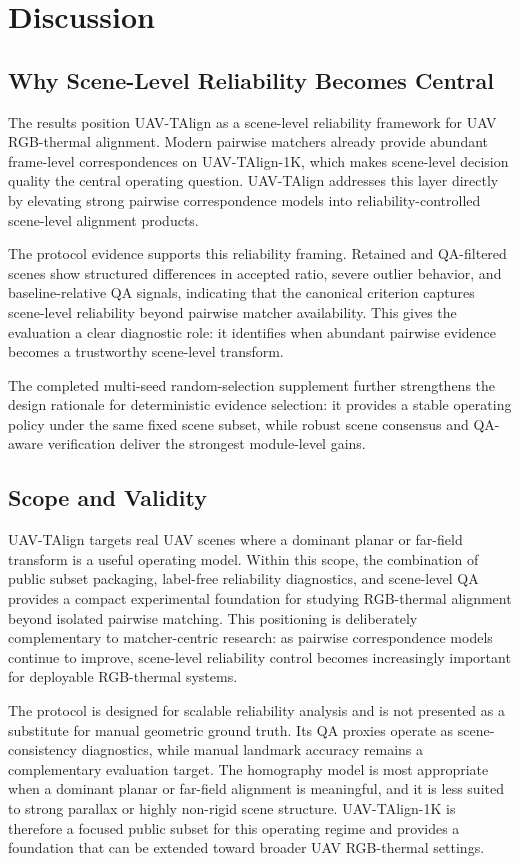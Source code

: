 
\section{Discussion}

\subsection{Why Scene-Level Reliability Becomes Central}

The results position UAV-TAlign as a scene-level reliability framework for UAV RGB-thermal
alignment. Modern pairwise matchers already provide abundant frame-level correspondences on
UAV-TAlign-1K, which makes scene-level decision quality the central operating question. UAV-TAlign
addresses this layer directly by elevating strong pairwise correspondence models into
reliability-controlled scene-level alignment products.

The protocol evidence supports this reliability framing. Retained and QA-filtered scenes show
structured differences in accepted ratio, severe outlier behavior, and baseline-relative QA
signals, indicating that the canonical criterion captures scene-level reliability beyond pairwise
matcher availability. This gives the evaluation a clear diagnostic role: it identifies when
abundant pairwise evidence becomes a trustworthy scene-level transform.

The completed multi-seed random-selection supplement further strengthens the design rationale for
deterministic evidence selection: it provides a stable operating policy under the same fixed
scene subset, while robust scene consensus and QA-aware verification deliver the strongest
module-level gains.

\subsection{Scope and Validity}

UAV-TAlign targets real UAV scenes where a dominant planar or far-field transform is a useful
operating model. Within this scope, the combination of public subset packaging, label-free
reliability diagnostics, and scene-level QA provides a compact experimental foundation for studying
RGB-thermal alignment beyond isolated pairwise matching. This positioning is deliberately
complementary to matcher-centric research: as pairwise correspondence models continue to improve,
scene-level reliability control becomes increasingly important for deployable RGB-thermal systems.

The protocol is designed for scalable reliability analysis and is not presented as a substitute for
manual geometric ground truth. Its QA proxies operate as scene-consistency diagnostics, while
manual landmark accuracy remains a complementary evaluation target. The homography model is most
appropriate when a dominant planar or far-field alignment is meaningful, and it is less suited to
strong parallax or highly non-rigid scene structure. UAV-TAlign-1K is therefore a focused public
subset for this operating regime and provides a foundation that can be extended toward broader UAV
RGB-thermal settings.
